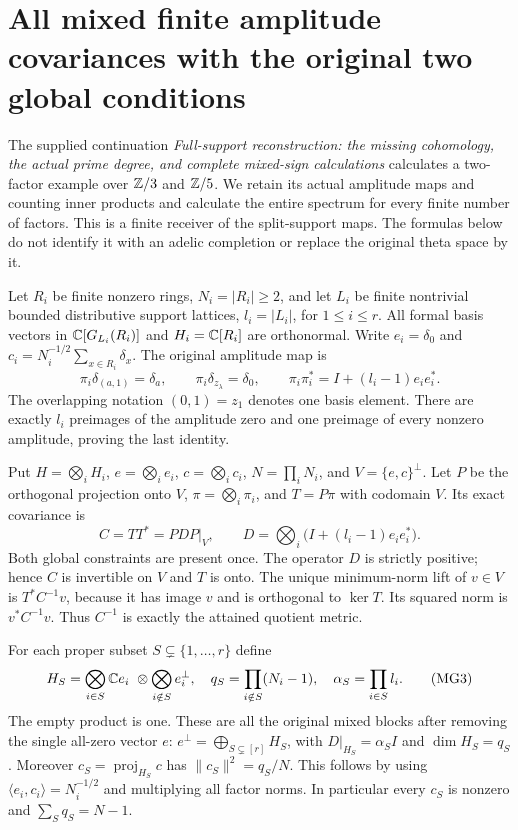 \section{All mixed finite amplitude covariances with the original two global conditions}
\label{sec:all-mixed-covariances}

The supplied continuation \emph{Full-support reconstruction: the missing
cohomology, the actual prime degree, and complete mixed-sign calculations}
calculates a two-factor example over $\mathbb Z/3$ and $\mathbb Z/5$. We retain its
actual amplitude maps and counting inner products and calculate the
entire spectrum for every finite number of factors. This is a finite
receiver of the split-support maps. The formulas below do not identify
it with an adelic completion or replace the original theta space by it.

Let $R_i$ be finite nonzero rings, $N_i=|R_i|\ge2$, and let $L_i$ be
finite nontrivial bounded distributive support lattices, $l_i=|L_i|$,
for $1\le i\le r$. All formal basis vectors in $\mathbb C[G_{L_i}(R_i)]$
and $H_i=\mathbb C[R_i]$ are orthonormal. Write $e_i=\delta_0$ and
$c_i=N_i^{-1/2}\sum_{x\in R_i}\delta_x$. The original amplitude map is
\[
 \pi_i\delta_{(a,1)}=\delta_a,\qquad
 \pi_i\delta_{z_\lambda}=\delta_0,\qquad
 \pi_i\pi_i^*=I+(l_i-1)e_ie_i^*.
 \tag{MG1}\label{mg:amplitude}
\]
The overlapping notation $(0,1)=z_1$ denotes one basis element.
There are exactly $l_i$ preimages of the amplitude zero and one
preimage of every nonzero amplitude, proving the last identity.

Put $H=\bigotimes_iH_i$, $e=\bigotimes_ie_i$, $c=\bigotimes_ic_i$,
$N=\prod_iN_i$, and $V=\{e,c\}^\perp$. Let $P$ be the orthogonal
projection onto $V$, $\pi=\bigotimes_i\pi_i$, and $T=P\pi$ with
codomain $V$. Its exact covariance is
\[
 C=TT^*=PDP|_V,\qquad
 D=\bigotimes_i\bigl(I+(l_i-1)e_ie_i^*\bigr).
 \tag{MG2}\label{mg:covariance}
\]
Both global constraints are present once. The operator $D$ is strictly
positive; hence $C$ is invertible on $V$ and $T$ is onto. The unique
minimum-norm lift of $v\in V$ is $T^*C^{-1}v$, because it has image
$v$ and is orthogonal to $\ker T$. Its squared norm is $v^*C^{-1}v$.
Thus $C^{-1}$ is exactly the attained quotient metric.

For each proper subset $S\subsetneq\{1,\ldots,r\}$ define
\[
 H_S=\bigotimes_{i\in S}\C e_i\ \otimes
            \bigotimes_{i\notin S}e_i^\perp,
 \quad q_S=\prod_{i\notin S}(N_i-1),
 \quad \alpha_S=\prod_{i\in S}l_i.
 \tag{MG3}\label{mg:blocks}
\]
The empty product is one. These are all the original mixed blocks
after removing the single all-zero vector $e$:
$e^\perp=\bigoplus_{S\subsetneq[r]}H_S$, with
$D|_{H_S}=\alpha_SI$ and $\dim H_S=q_S$.
Moreover $c_S=\operatorname{proj}_{H_S}c$ has
$\|c_S\|^2=q_S/N$. This follows by using
$\langle e_i,c_i\rangle=N_i^{-1/2}$ and multiplying all factor
norms. In particular every $c_S$ is nonzero and
$\sum_Sq_S=N-1$.

